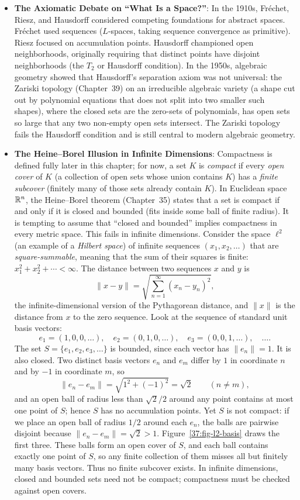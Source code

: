 \begin{itemize}
  \item \textbf{The Axiomatic Debate on ``What Is a Space?''}: In the 1910s, Fr\'echet, Riesz, and Hausdorff considered competing foundations for abstract spaces. Fr\'echet used sequences ($L$-spaces, taking sequence convergence as primitive). Riesz focused on accumulation points. Hausdorff championed open neighborhoods, originally requiring that distinct points have disjoint neighborhoods (the $T_2$ or Hausdorff condition). In the 1950s, algebraic geometry showed that Hausdorff's separation axiom was not universal: the Zariski topology (Chapter~39) on an irreducible algebraic variety (a shape cut out by polynomial equations that does not split into two smaller such shapes), where the closed sets are the zero-sets of polynomials, has open sets so large that any two non-empty open sets intersect. The Zariski topology fails the Hausdorff condition and is still central to modern algebraic geometry.
  \item \textbf{The Heine--Borel Illusion in Infinite Dimensions}: Compactness is defined fully later in this chapter; for now, a set $K$ is \emph{compact} if every \emph{open cover} of $K$ (a collection of open sets whose union contains $K$) has a \emph{finite subcover} (finitely many of those sets already contain $K$). In Euclidean space $\mathbb{R}^n$, the Heine--Borel theorem (Chapter~35) states that a set is compact if and only if it is closed and bounded (fits inside some ball of finite radius). It is tempting to assume that ``closed and bounded'' implies compactness in every metric space. This fails in infinite dimensions. Consider the space $\ell^2$ (an example of a \emph{Hilbert space}) of infinite sequences $(x_1, x_2, \dots)$ that are \emph{square-summable}, meaning that the sum of their squares is finite: $x_1^2 + x_2^2 + \cdots < \infty$. The distance between two sequences $x$ and $y$ is
  \[
  \|x - y\| = \sqrt{\sum_{n=1}^{\infty} (x_n - y_n)^2},
  \]
  the infinite-dimensional version of the Pythagorean distance, and $\|x\|$ is the distance from $x$ to the zero sequence. Look at the sequence of standard unit basis vectors:
  \[
  e_1 = (1, 0, 0, \dots), \quad e_2 = (0, 1, 0, \dots), \quad e_3 = (0, 0, 1, \dots), \quad \dots.
  \]
  The set $S = \{e_1, e_2, e_3, \dots\}$ is bounded, since each vector has $\|e_n\| = 1$. It is also closed. Two distinct basis vectors $e_n$ and $e_m$ differ by $1$ in coordinate $n$ and by $-1$ in coordinate $m$, so
  \[
  \|e_n - e_m\| = \sqrt{1^2 + (-1)^2} = \sqrt{2} \qquad (n \neq m),
  \]
  and an open ball of radius less than $\sqrt2/2$ around any point contains at most one point of $S$; hence $S$ has no accumulation points. Yet $S$ is not compact: if we place an open ball of radius $1/2$ around each $e_n$, the balls are pairwise disjoint because $\|e_n - e_m\| = \sqrt{2} > 1$. Figure~\ref{37:fig-l2-basis} draws the first three. These balls form an open cover of $S$, and each ball contains exactly one point of $S$, so any finite collection of them misses all but finitely many basis vectors. Thus no finite subcover exists. In infinite dimensions, closed and bounded sets need not be compact; compactness must be checked against open covers.

\end{itemize}
